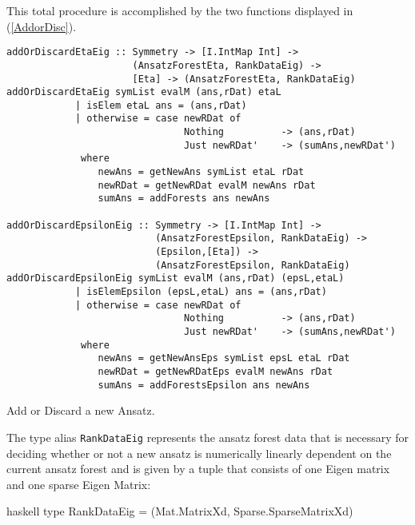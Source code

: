 This total procedure is accomplished by the two functions displayed in (\ref{AddorDisc}).
\begin{listing}[hbt!]
\begin{verbatim}
addOrDiscardEtaEig :: Symmetry -> [I.IntMap Int] ->
                      (AnsatzForestEta, RankDataEig) -> 
                      [Eta] -> (AnsatzForestEta, RankDataEig)
addOrDiscardEtaEig symList evalM (ans,rDat) etaL
            | isElem etaL ans = (ans,rDat)
            | otherwise = case newRDat of
                               Nothing          -> (ans,rDat)
                               Just newRDat'    -> (sumAns,newRDat')
             where
                newAns = getNewAns symList etaL rDat
                newRDat = getNewRDat evalM newAns rDat
                sumAns = addForests ans newAns

addOrDiscardEpsilonEig :: Symmetry -> [I.IntMap Int] ->
                          (AnsatzForestEpsilon, RankDataEig) ->
                          (Epsilon,[Eta]) ->
                          (AnsatzForestEpsilon, RankDataEig)
addOrDiscardEpsilonEig symList evalM (ans,rDat) (epsL,etaL)
            | isElemEpsilon (epsL,etaL) ans = (ans,rDat)
            | otherwise = case newRDat of
                               Nothing          -> (ans,rDat)
                               Just newRDat'    -> (sumAns,newRDat')
             where
                newAns = getNewAnsEps symList epsL etaL rDat
                newRDat = getNewRDatEps evalM newAns rDat
                sumAns = addForestsEpsilon ans newAns
\end{verbatim} 
\caption{Add or Discard a new Ansatz.}\label{AddorDisc}
\end{listing}
The type alias \texttt{RankDataEig} represents the ansatz forest data that is necessary for deciding whether or not a new ansatz is numerically linearly dependent on the current ansatz forest and is given by a tuple that consists of one Eigen matrix and one sparse Eigen Matrix:
\begin{center}
\begin{cminted}{haskell}
type RankDataEig = (Mat.MatrixXd, Sparse.SparseMatrixXd)
\end{cminted}
\end{center}
